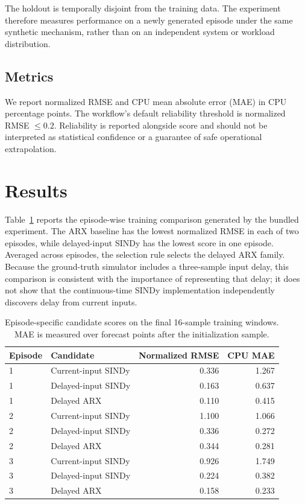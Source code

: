 \documentclass[11pt]{article}
\begin{document}
The holdout is temporally disjoint from the training data. The experiment therefore measures performance on a newly generated episode under the same synthetic mechanism, rather than on an independent system or workload distribution.

\subsection{Metrics}

We report normalized RMSE and CPU mean absolute error (MAE) in CPU percentage points. The workflow's default reliability threshold is normalized RMSE $\leq 0.2$. Reliability is reported alongside score and should not be interpreted as statistical confidence or a guarantee of safe operational extrapolation.

\section{Results}

Table~\ref{tab:training-results} reports the episode-wise training comparison generated by the bundled experiment. The ARX baseline has the lowest normalized RMSE in each of two episodes, while delayed-input SINDy has the lowest score in one episode. Averaged across episodes, the selection rule selects the delayed ARX family. Because the ground-truth simulator includes a three-sample input delay, this comparison is consistent with the importance of representing that delay; it does not show that the continuous-time SINDy implementation independently discovers delay from current inputs.

\begin{table}[ht]
\centering
\caption{Episode-specific candidate scores on the final 16-sample training windows. MAE is measured over forecast points after the initialization sample.}
\label{tab:training-results}
\begin{tabular}{llrr}
\toprule
Episode & Candidate & Normalized RMSE & CPU MAE \\
\midrule
1 & Current-input SINDy & 0.336 & 1.267 \\
1 & Delayed-input SINDy & 0.163 & 0.637 \\
1 & Delayed ARX & 0.110 & 0.415 \\
2 & Current-input SINDy & 1.100 & 1.066 \\
2 & Delayed-input SINDy & 0.336 & 0.272 \\
2 & Delayed ARX & 0.344 & 0.281 \\
3 & Current-input SINDy & 0.926 & 1.749 \\
3 & Delayed-input SINDy & 0.224 & 0.382 \\
3 & Delayed ARX & 0.158 & 0.233 \\
\bottomrule
\end{tabular}
\end{table}
\end{document}
